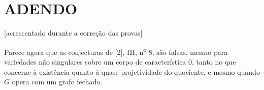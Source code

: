 \section*{ADENDO}
\begin{center}
{\small [acrescentado durante a correção das provas]}
\end{center}

Parece agora que as conjecturas de [2], III, n\textsuperscript{o} 8, são falsas,
mesmo para variedades não singulares sobre um corpo de característica 0, tanto
no que concerne à existência quanto à quase projetividade do quociente, e mesmo
quando $G$ opera com um grafo fechado.

\par
